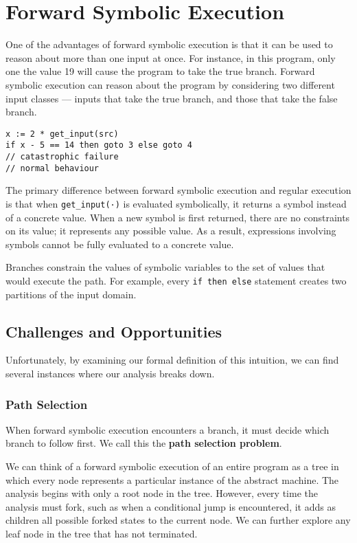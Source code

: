 \section{Forward Symbolic Execution} 
One of the advantages of forward symbolic execution is that it can be used to reason about more than one input at once. For instance, in this program, only one the value 19 will cause the program to take the true branch. Forward symbolic execution can reason about the program by considering two different input classes — inputs that take the true branch, and those that take the false branch.

\begin{lstlisting}
x := 2 * get_input(src)
if x - 5 == 14 then goto 3 else goto 4
// catastrophic failure
// normal behaviour
\end{lstlisting}

The primary difference between forward symbolic execution and regular execution is that when \texttt{get\_input(·)} is evaluated symbolically, it returns a symbol instead of a concrete value. When a new symbol is first returned, there are no constraints on its value; it represents any possible value. As a result, expressions involving symbols cannot be fully evaluated to a concrete value.

Branches constrain the values of symbolic variables to the set of values that would execute the path. For example, every \texttt{if then else} statement creates two partitions of the input domain.

\subsection{Challenges and Opportunities}
Unfortunately, by examining our formal definition of this intuition, we can find several instances where our analysis breaks down.

\subsubsection{Path Selection} 
When forward symbolic execution encounters a branch, it must decide which branch to follow first. We call this the \textbf{path selection problem}.

We can think of a forward symbolic execution of an entire program as a tree in which every node represents a particular instance of the abstract machine. The analysis begins with only a root node in the tree. However, every time the analysis must fork, such as when a conditional jump is encountered, it adds as children all possible forked states to the current node. We can further explore any leaf node in the tree that has not terminated. 

